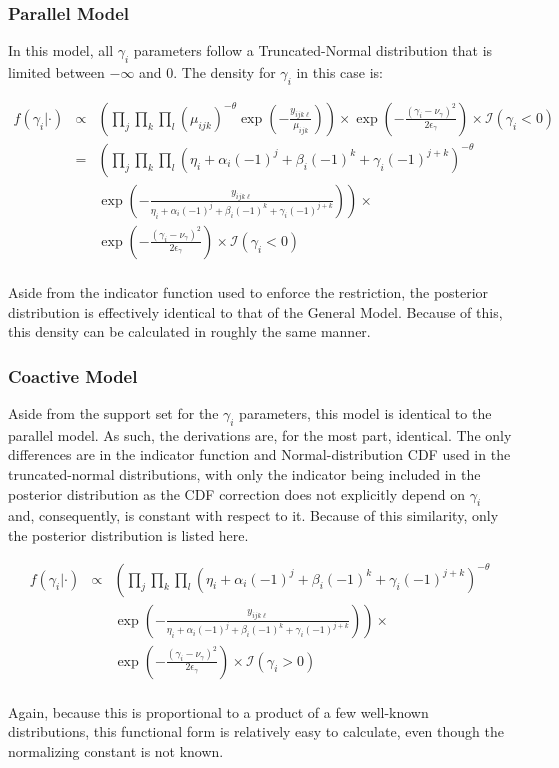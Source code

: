 \subsubsection{Parallel Model}
In this model, all $\gamma_i$ parameters follow a Truncated-Normal
distribution that is limited between $-\infty$ and 0.  The density for
$\gamma_i$ in this case is:

\begin{eqnarray*}
\displaystyle{f(\gamma_i|\cdot)}&\propto&\displaystyle{\left(\prod_j\prod_k\prod_l(\mu_{ijk})^{-\theta}\exp\left(-\frac{y_{ijk\ell}}{\mu_{ijk}}\right)\right)\times\exp\left(-\frac{(\gamma_i-\nu_\gamma)^2}{2\epsilon_\gamma}\right)\times\mathcal{I}\left(\gamma_i<0\right)}\\
&=&\displaystyle{\left(\prod_j\prod_k\prod_l(\eta_i + \alpha_i\left(-1\right)^j + \beta_i \left(-1\right)^k + \gamma_i \left(-1\right)^{j+k})^{-\theta}\right.}\\
&&\displaystyle{\left.\exp\left(-\frac{y_{ijk\ell}}{\eta_i + \alpha_i\left(-1\right)^j + \beta_i \left(-1\right)^k + \gamma_i \left(-1\right)^{j+k}}\right)\right)\times}\\
&&\displaystyle{\exp\left(-\frac{(\gamma_i-\nu_\gamma)^2}{2\epsilon_\gamma}\right)\times\mathcal{I}\left(\gamma_i<0\right)}\\
\end{eqnarray*}

Aside from the indicator function used to enforce the restriction, the
posterior distribution is effectively identical to that of the General
Model.  Because of this, this density can be calculated in roughly the
same manner.


\subsubsection{Coactive Model}
Aside from the support set for the $\gamma_i$ parameters, this model
is identical to the parallel model.  As such, the derivations are, for
the most part, identical.  The only differences are in the indicator
function and Normal-distribution CDF used in the truncated-normal
distributions, with only the indicator being included in the posterior
distribution as the CDF correction does not explicitly depend on
$\gamma_i$ and, consequently, is constant with respect to it.  Because
of this similarity, only the posterior distribution is listed here.

\begin{eqnarray*}
\displaystyle{f(\gamma_i|\cdot)}&\propto&\displaystyle{\left(\prod_j\prod_k\prod_l(\eta_i + \alpha_i\left(-1\right)^j + \beta_i \left(-1\right)^k + \gamma_i \left(-1\right)^{j+k})^{-\theta}\right.}\\
&&\displaystyle{\left.\exp\left(-\frac{y_{ijk\ell}}{\eta_i + \alpha_i\left(-1\right)^j + \beta_i \left(-1\right)^k + \gamma_i \left(-1\right)^{j+k}}\right)\right)\times}\\
&&\displaystyle{\exp\left(-\frac{(\gamma_i-\nu_\gamma)^2}{2\epsilon_\gamma}\right)\times\mathcal{I}\left(\gamma_i>0\right)}\\
\end{eqnarray*}

Again, because this is proportional to a product of a few well-known
distributions, this functional form is relatively easy to calculate,
even though the normalizing constant is not known.

%

